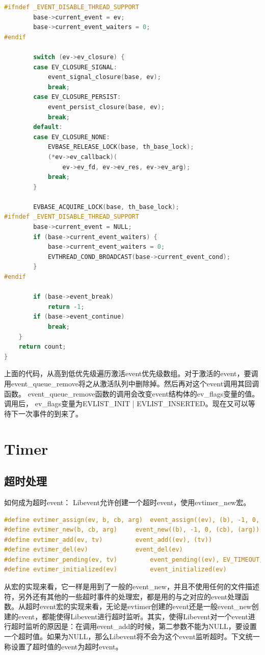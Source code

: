 \documentclass[11pt,a4paper]{article}
\begin{document}
\begin{lstlisting}[language=C]
#ifndef _EVENT_DISABLE_THREAD_SUPPORT
		base->current_event = ev;
		base->current_event_waiters = 0;
#endif

		switch (ev->ev_closure) {
		case EV_CLOSURE_SIGNAL:
			event_signal_closure(base, ev);
			break;
		case EV_CLOSURE_PERSIST:
			event_persist_closure(base, ev);
			break;
		default:
		case EV_CLOSURE_NONE:
			EVBASE_RELEASE_LOCK(base, th_base_lock);
			(*ev->ev_callback)(
				ev->ev_fd, ev->ev_res, ev->ev_arg);
			break;
		}

		EVBASE_ACQUIRE_LOCK(base, th_base_lock);
#ifndef _EVENT_DISABLE_THREAD_SUPPORT
		base->current_event = NULL;
		if (base->current_event_waiters) {
			base->current_event_waiters = 0;
			EVTHREAD_COND_BROADCAST(base->current_event_cond);
		}
#endif

		if (base->event_break)
			return -1;
		if (base->event_continue)
			break;
	}
	return count;
}
\end{lstlisting}
上面的代码，从高到低优先级遍历激活event优先级数组。对于激活的event，要调用event\_queue\_remove将之从激活队列中删除掉。然后再对这个event调用其回调函数。
event\_queue\_remove函数的调用会改变event结构体的ev\_flags变量的值。调用后， ev\_flags变量为EVLIST\_INIT | EVLIST\_INSERTED。现在又可以等待下一次事件的到来了。

\newpage

\section{Timer}

\subsection{超时处理}
如何成为超时event：       
Libevent允许创建一个超时event，使用evtimer\_new宏。
\begin{lstlisting}[language=C]
#define evtimer_assign(ev, b, cb, arg)	event_assign((ev), (b), -1, 0, (cb), (arg))
#define evtimer_new(b, cb, arg)		event_new((b), -1, 0, (cb), (arg))
#define evtimer_add(ev, tv)			event_add((ev), (tv))
#define evtimer_del(ev)				event_del(ev)
#define evtimer_pending(ev, tv)			event_pending((ev), EV_TIMEOUT, (tv))
#define evtimer_initialized(ev)			event_initialized(ev)
\end{lstlisting}

从宏的实现来看，它一样是用到了一般的event\_new，并且不使用任何的文件描述符，另外还有其他的一些超时事件的处理宏，都是用的与之对应的event处理函数。从超时event宏的实现来看，无论是evtimer创建的event还是一般event\_new创建的event，都能使得Libevent进行超时监听。其实，使得Libevent对一个event进行超时监听的原因是：在调用event\_add的时候，第二参数不能为NULL，要设置一个超时值。如果为NULL，那么Libevent将不会为这个event监听超时。下文统一称设置了超时值的event为超时event。
\end{document}
